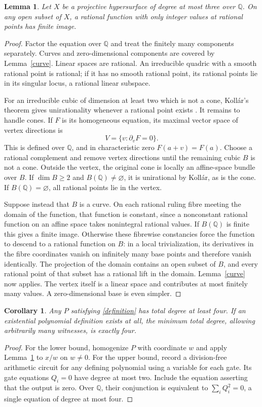 \documentclass[11pt]{article}
\newtheorem{lemma}[theorem]{Lemma}
\newtheorem{corollary}[theorem]{Corollary}
\theoremstyle{remark}\newtheorem{remark}[theorem]{Remark}
\newcommand{\Q}{\mathbb Q}\newcommand{\Z}{\mathbb Z}\newcommand{\R}{\mathbb R}
\begin{document}
\begin{lemma}\label{cubic}
Let \(X\) be a projective hypersurface of degree at most three over \(\Q\). On any open subset of \(X\), a rational function with only integer values at rational points has finite image.
\end{lemma}
\begin{proof}
Factor the equation over \(\Q\) and treat the finitely many components separately. Curves and zero-dimensional components are covered by Lemma~\ref{curve}. Linear spaces are rational. An irreducible quadric with a smooth rational point is rational; if it has no smooth rational point, its rational points lie in its singular locus, a rational linear subspace.

For an irreducible cubic of dimension at least two which is not a cone, Koll\'ar's theorem gives unirationality whenever a rational point exists \cite[Theorem 2]{Kollar}. It remains to handle cones. If \(F\) is its homogeneous equation, its maximal vector space of vertex directions is
\[
 V=\{v:\partial_vF=0\}.
\]
This is defined over \(\Q\), and in characteristic zero \(F(a+v)=F(a)\). Choose a rational complement and remove vertex directions until the remaining cubic \(B\) is not a cone. Outside the vertex, the original cone is locally an affine-space bundle over \(B\). If \(\dim B\ge2\) and \(B(\Q)\ne\varnothing\), it is unirational by Koll\'ar, as is the cone. If \(B(\Q)=\varnothing\), all rational points lie in the vertex.

Suppose instead that \(B\) is a curve. On each rational ruling fibre meeting the domain of the function, that function is constant, since a nonconstant rational function on an affine space takes nonintegral rational values. If \(B(\Q)\) is finite this gives a finite image. Otherwise these fibrewise constancies force the function to descend to a rational function on \(B\): in a local trivialization, its derivatives in the fibre coordinates vanish on infinitely many base points and therefore vanish identically. The projection of the domain contains an open subset of \(B\), and every rational point of that subset has a rational lift in the domain. Lemma~\ref{curve} now applies. The vertex itself is a linear space and contributes at most finitely many values. A zero-dimensional base is even simpler.
\end{proof}

\begin{corollary}\label{degree}
Any \(P\) satisfying \eqref{definition} has total degree at least four. If an existential polynomial definition exists at all, the minimum total degree, allowing arbitrarily many witnesses, is exactly four.
\end{corollary}
\begin{proof}
For the lower bound, homogenize \(P\) with coordinate \(w\) and apply Lemma~\ref{cubic} to \(x/w\) on \(w\ne0\). For the upper bound, record a division-free arithmetic circuit for any defining polynomial using a variable for each gate. Its gate equations \(Q_i=0\) have degree at most two. Include the equation asserting that the output is zero. Over \(\Q\), their conjunction is equivalent to \(\sum_iQ_i^2=0\), a single equation of degree at most four.
\end{proof}
\end{document}
